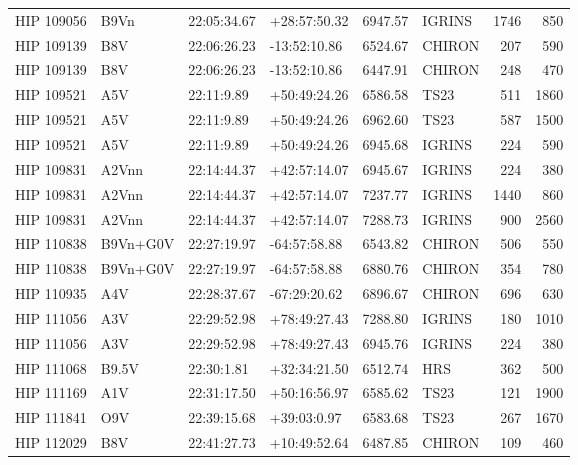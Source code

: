 \documentclass{emulateapj}
\begin{document}
\begin{longtable*}{|l|lllrlrr|}
  HIP 109056 &           B9Vn &    22:05:34.67 &   +28:57:50.32 &  6947.57 &     IGRINS &     1746 &     850 \\
  HIP 109139 &            B8V &    22:06:26.23 &   -13:52:10.86 &  6524.67 &     CHIRON &      207 &     590 \\
  HIP 109139 &            B8V &    22:06:26.23 &   -13:52:10.86 &  6447.91 &     CHIRON &      248 &     470 \\
  HIP 109521 &            A5V &     22:11:9.89 &   +50:49:24.26 &  6586.58 &       TS23 &      511 &    1860 \\
  HIP 109521 &            A5V &     22:11:9.89 &   +50:49:24.26 &  6962.60 &       TS23 &      587 &    1500 \\
  HIP 109521 &            A5V &     22:11:9.89 &   +50:49:24.26 &  6945.68 &     IGRINS &      224 &     590 \\
  HIP 109831 &          A2Vnn &    22:14:44.37 &   +42:57:14.07 &  6945.67 &     IGRINS &      224 &     380 \\
  HIP 109831 &          A2Vnn &    22:14:44.37 &   +42:57:14.07 &  7237.77 &     IGRINS &     1440 &     860 \\
  HIP 109831 &          A2Vnn &    22:14:44.37 &   +42:57:14.07 &  7288.73 &     IGRINS &      900 &    2560 \\
  HIP 110838 &       B9Vn+G0V &    22:27:19.97 &   -64:57:58.88 &  6543.82 &     CHIRON &      506 &     550 \\
  HIP 110838 &       B9Vn+G0V &    22:27:19.97 &   -64:57:58.88 &  6880.76 &     CHIRON &      354 &     780 \\
  HIP 110935 &            A4V &    22:28:37.67 &   -67:29:20.62 &  6896.67 &     CHIRON &      696 &     630 \\
  HIP 111056 &            A3V &    22:29:52.98 &   +78:49:27.43 &  7288.80 &     IGRINS &      180 &    1010 \\
  HIP 111056 &            A3V &    22:29:52.98 &   +78:49:27.43 &  6945.76 &     IGRINS &      224 &     380 \\
  HIP 111068 &          B9.5V &     22:30:1.81 &   +32:34:21.50 &  6512.74 &        HRS &      362 &     500 \\
  HIP 111169 &            A1V &    22:31:17.50 &   +50:16:56.97 &  6585.62 &       TS23 &      121 &    1900 \\
  HIP 111841 &            O9V &    22:39:15.68 &    +39:03:0.97 &  6583.68 &       TS23 &      267 &    1670 \\
  HIP 112029 &            B8V &    22:41:27.73 &   +10:49:52.64 &  6487.85 &     CHIRON &      109 &     460 \\

\end{longtable*}
\end{document}
